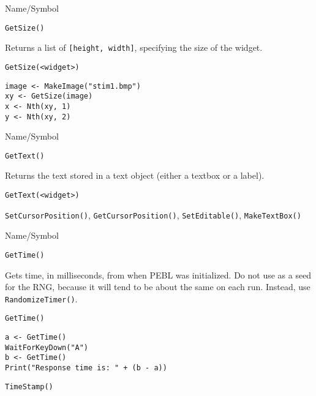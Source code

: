 \rl



\begin{desc}{Name/Symbol}
\item[Name/Symbol]	\verb+GetSize()+

\item[Description] Returns a list of \verb+[height, width]+,
  specifying the size of the widget.

\item[Usage]
\begin{verbatim}
GetSize(<widget>)
\end{verbatim}

\item[Example]
\begin{verbatim}
image <- MakeImage("stim1.bmp")
xy <- GetSize(image)
x <- Nth(xy, 1)
y <- Nth(xy, 2)
\end{verbatim}

\item[See Also]	
\end{desc}

\rl



\begin{desc}{Name/Symbol}
\item[Name/Symbol]	\verb+GetText()+

\item[Description]	Returns the text stored in a text object 
		(either a textbox or a label).

\item[Usage]
\begin{verbatim}
GetText(<widget>)
\end{verbatim}

\item[Example]	

\item[See Also]	\verb+SetCursorPosition()+, \verb+GetCursorPosition()+, \verb+SetEditable()+, \verb+MakeTextBox()+
\end{desc}

\rl



\begin{desc}{Name/Symbol}
\item[Name/Symbol]	\verb+GetTime()+

\item[Description] Gets time, in milliseconds, from when PEBL was
  initialized.  Do not use as a seed for the RNG, because it will tend
  to be about the same on each run. Instead, use \verb+RandomizeTimer()+.

\item[Usage]
\begin{verbatim}
GetTime()
\end{verbatim}

\item[Example]
\begin{verbatim}
a <- GetTime()
WaitForKeyDown("A")
b <- GetTime()
Print("Response time is: " + (b - a))
\end{verbatim}

\item[See Also]	\verb+TimeStamp()+
\end{desc}

